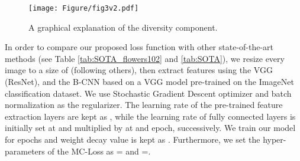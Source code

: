 \documentclass[journal]{IEEEtran}
\begin{document}
\begin{figure}[!t]
  \begin{center}
    \texttt{[image: Figure/fig3v2.pdf]}
  \end{center}
  \caption{A graphical explanation of the diversity component.}
  \label{fig:explaindivloss}
\end{figure}




In order to compare our proposed loss function with other state-of-the-art methods (see Table \ref{tab:SOTA_flowers102} and \ref{tab:SOTA}), we resize every image to a size of  (following others), then extract features using the VGG (ResNet), and the B-CNN \cite{lin2015bilinear} based on a VGG model pre-trained on the ImageNet classification dataset. We use Stochastic Gradient Descent optimizer and batch normalization as the regularizer. The learning rate of the pre-trained feature extraction layers are kept as , while the learning rate of fully connected layers is initially set at  and multiplied by  at  and  epoch, successively. We train our model for  epochs and weight decay value is kept as  . Furthermore, we set the hyper-parameters of the MC-Loss as  = and =.
\end{document}
